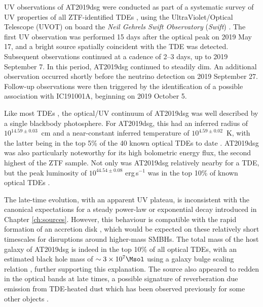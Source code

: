 UV observations of AT2019dsg were conducted as part of a systematic survey of UV properties of all ZTF-identified TDEs \cite{van_velzen_20}, using the UltraViolet/Optical Telescope (UVOT) on board the \textit{Neil Gehrels Swift Observatory} (\textit{Swift}) . The first UV observation was performed 15 days after the optical peak on 2019 May 17, and a bright source spatially coincident with the TDE was detected. Subsequent observations continued at a cadence of 2--3 days, up to 2019 September 7. In this period, AT2019dsg continued to steadily dim. An additional observation occurred shortly before the neutrino detection on 2019 September 27. Follow-up observations were then triggered by the identification of a possible association with IC191001A, beginning on 2019 October 5. 

Like most TDEs \cite{van_velzen_20}, the optical/UV continuum of AT2019dsg was well described by a single blackbody photosphere. For AT2019dsg, this had an inferred radius of $10^{14.59 \pm 0.03}$~cm and a near-constant inferred temperature of $10^{4.59 \pm 0.02}$~K, with the latter being in the top 5\% of the 40 known optical TDEs to date \cite{van_velzen_20}. AT2019dsg was also particularly noteworthy for its high bolometric energy flux, the second highest of the ZTF sample. Not only was AT2019dsg relatively nearby for a TDE, but the peak luminosity of $10^{44.54 \pm 0.08}$ erg\,s$^{-1}$ was in the top 10\% of known optical TDEs \cite{van_velzen_20}. 

The late-time evolution, with an apparent UV plateau, is inconsistent with the canonical expectations for a steady power-law or exponential decay introduced in Chapter \ref{ch:sources}. However, this behaviour is compatible with the rapid formation of an accretion disk , which would be expected on these relatively short timescales for disruptions around higher-mass SMBHs. The total mass of the host galaxy of AT2019dsg is indeed in the top 10$\%$ of all optical TDEs, with an estimated black hole mass of $\sim 3 \times 10^{7} \Msol$ using a galaxy bulge scaling relation \cite{van_velzen_20}, further supporting this explanation. The source also appeared to redden in the optical bands at late times, a possible signature of reverberation due emission from TDE-heated dust which has been observed previously for some other objects . 


